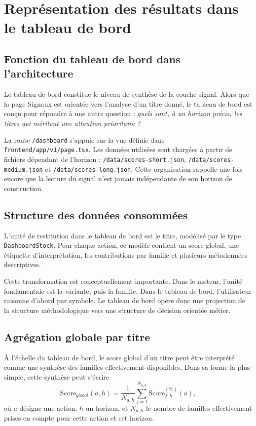 \chapter{Représentation des résultats dans le tableau de bord}

\section{Fonction du tableau de bord dans l'architecture}
Le tableau de bord constitue le niveau de synthèse de la couche signal. Alors que
la page Signaux est orientée vers l'analyse d'un titre donné, le tableau de bord
est conçu pour répondre à une autre question : \emph{quels sont, à un horizon
précis, les titres qui méritent une attention prioritaire ?}

La route \texttt{/dashboard} s'appuie sur la vue définie dans
\texttt{frontend/app/v1/page.tsx}. Les données utilisées sont chargées à partir
de fichiers dépendant de l'horizon : \texttt{/data/scores-short.json},
\texttt{/data/scores-medium.json} et \texttt{/data/scores-long.json}. Cette
organisation rappelle une fois encore que la lecture du signal n'est jamais
indépendante de son horizon de construction.

\section{Structure des données consommées}
L'unité de restitution dans le tableau de bord est le titre, modélisé par le type
\texttt{DashboardStock}. Pour chaque action, ce modèle contient un score global,
une étiquette d'interprétation, les contributions par famille et plusieurs
métadonnées descriptives.

Cette transformation est conceptuellement importante. Dans le moteur, l'unité
fondamentale est la variante, puis la famille. Dans le tableau de bord,
l'utilisateur raisonne d'abord par symbole. Le tableau de bord opère donc une
projection de la structure méthodologique vers une structure de décision orientée
métier.

\section{Agrégation globale par titre}
À l'échelle du tableau de bord, le score global d'un titre peut être interprété
comme une synthèse des familles effectivement disponibles. Dans sa forme la plus
simple, cette synthèse peut s'écrire
\begin{equation}
\mathrm{Score}_{global}(a,h)=\frac{1}{N_{a,h}}\sum_{f=1}^{N_{a,h}} \mathrm{Score}^{(\%)}_{f,h}(a),
\label{eq:dashboard-global}
\end{equation}
où \(a\) désigne une action, \(h\) un horizon, et \(N_{a,h}\) le nombre de
familles effectivement prises en compte pour cette action et cet horizon.

